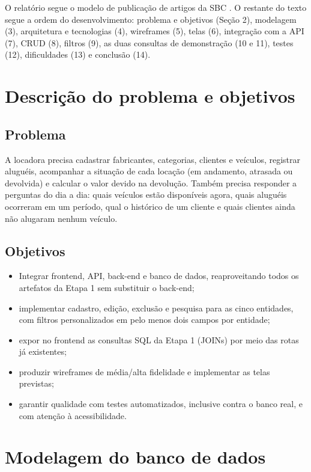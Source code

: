 \documentclass[12pt]{article}
\begin{document}
O relatório segue o modelo de publicação de artigos da SBC \cite{sbc}. O restante do texto segue a ordem do desenvolvimento: problema e objetivos (Seção 2), modelagem (3), arquitetura e tecnologias (4), wireframes (5), telas (6), integração com a API (7), CRUD (8), filtros (9), as duas consultas de demonstração (10 e 11), testes (12), dificuldades (13) e conclusão (14).

\section{Descrição do problema e objetivos}

\subsection{Problema}

A locadora precisa cadastrar fabricantes, categorias, clientes e veículos, registrar aluguéis, acompanhar a situação de cada locação (em andamento, atrasada ou devolvida) e calcular o valor devido na devolução. Também precisa responder a perguntas do dia a dia: quais veículos estão disponíveis agora, quais aluguéis ocorreram em um período, qual o histórico de um cliente e quais clientes ainda não alugaram nenhum veículo.

\subsection{Objetivos}

\begin{itemize}
  \item Integrar frontend, API, back-end e banco de dados, reaproveitando todos os artefatos da Etapa 1 sem substituir o back-end;
  \item implementar cadastro, edição, exclusão e pesquisa para as cinco entidades, com filtros personalizados em pelo menos dois campos por entidade;
  \item expor no frontend as consultas SQL da Etapa 1 (JOINs) por meio das rotas já existentes;
  \item produzir wireframes de média/alta fidelidade e implementar as telas previstas;
  \item garantir qualidade com testes automatizados, inclusive contra o banco real, e com atenção à acessibilidade.
\end{itemize}

\section{Modelagem do banco de dados}
\end{document}
